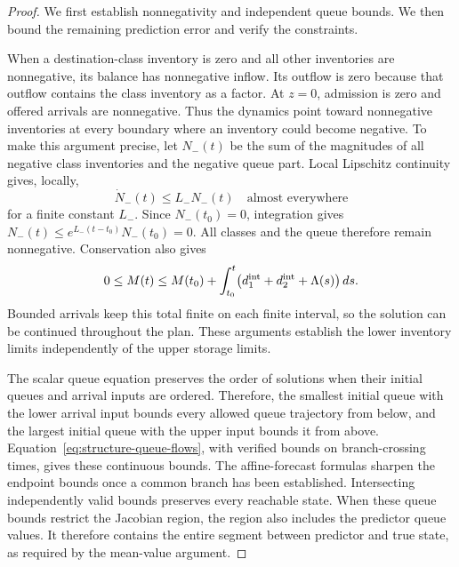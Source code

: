 \documentclass[preprint,12pt]{elsarticle}
\begin{document}
\begin{proof}
We first establish nonnegativity and independent queue bounds. We then
bound the remaining prediction error and verify the constraints.

When a destination-class inventory is zero and all other inventories are
nonnegative, its balance has nonnegative inflow. Its outflow is zero
because that outflow contains the class inventory as a factor. At $z=0$,
admission is zero and offered arrivals are nonnegative. Thus the dynamics
point toward nonnegative inventories at every boundary where an inventory
could become negative. To make this argument precise, let $N_-(t)$ be the
sum of the magnitudes of all negative class inventories and the negative
queue part. Local Lipschitz continuity gives, locally,
\[
 \dot N_-(t)\le L_-N_-(t)
 \quad\text{almost everywhere}
\]
for a finite constant $L_-$. Since $N_-(t_0)=0$, integration gives
$N_-(t)\le e^{L_-(t-t_0)}N_-(t_0)=0$. All classes and the queue therefore
remain nonnegative. Conservation also gives
\[
 0\le M(t)\le M(t_0)+
 \int_{t_0}^t
 \bigl(d^{\rm int}_1+d^{\rm int}_2+\Lambda(s)\bigr)\,ds.
\]
Bounded arrivals keep this total finite on each finite interval, so the
solution can be continued throughout the plan. These arguments establish
the lower inventory limits independently of the upper storage limits.

The scalar queue equation preserves the order of solutions when their
initial queues and arrival inputs are ordered. Therefore, the smallest
initial queue with the lower arrival input bounds every allowed queue
trajectory from below, and the largest initial queue with the upper input
bounds it from above. Equation~\eqref{eq:structure-queue-flows}, with
verified bounds on branch-crossing times, gives these continuous bounds.
The affine-forecast formulas sharpen the endpoint bounds once a common
branch has been established. Intersecting independently valid bounds
preserves every reachable state. When these queue bounds restrict the
Jacobian region, the region also includes the predictor queue values.
It therefore contains the entire segment between predictor and true state,
as required by the mean-value argument.


\end{proof}
\end{document}
